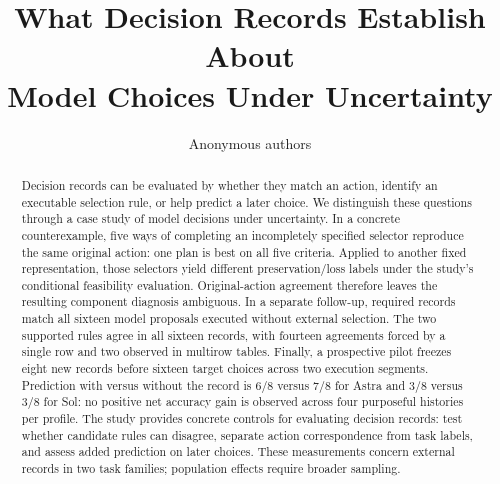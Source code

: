 \documentclass[10pt]{article}
\title{What Decision Records Establish About\\Model Choices Under Uncertainty}
\author{Anonymous authors}
\begin{document}
\raggedbottom
\maketitle
\begingroup\renewcommand{\thefootnote}{}\endgroup
\begin{abstract}
Decision records can be evaluated by whether they match an action,
identify an executable selection rule, or help predict a later choice.
We distinguish these questions through a case study of model decisions
under uncertainty. In a concrete counterexample, five ways of completing
an incompletely specified selector reproduce the same original action:
one plan is best on all five criteria. Applied to another fixed
representation, those selectors yield different preservation/loss labels
under the study's conditional feasibility evaluation. Original-action
agreement therefore leaves the resulting component diagnosis ambiguous.
In a separate follow-up, required records match all sixteen model proposals
executed without external selection. The two supported rules agree in all
sixteen records, with fourteen agreements forced by a single row and two
observed in multirow tables. Finally, a prospective pilot freezes eight new
records before sixteen target choices across two execution segments.
Prediction with versus without the record is 6/8 versus 7/8 for Astra and
3/8 versus 3/8 for Sol: no positive net accuracy gain is observed across
four purposeful histories per profile. The study provides concrete controls
for evaluating decision records: test whether candidate rules can disagree,
separate action correspondence from task labels, and assess added prediction
on later choices. These measurements concern external records in two task
families; population effects require broader sampling.
\end{abstract}



\clearpage\appendix

\end{document}
